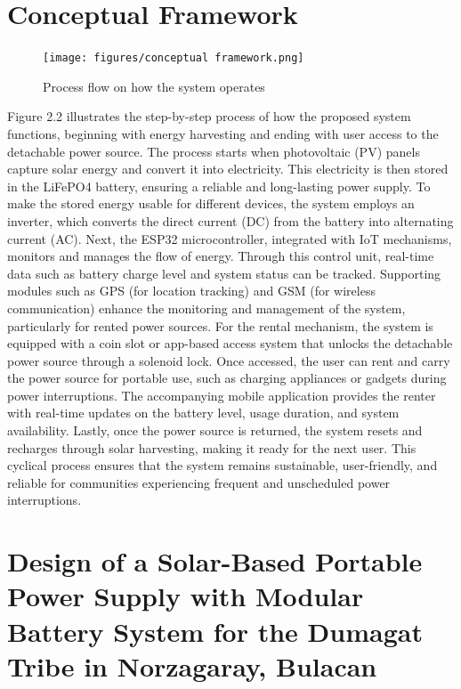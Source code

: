 {\section{Conceptual Framework}

\begin{figure}[H]
	\centering
	\caption{Process flow on how the system operates}
	\label{fig:conceptualfra}
	\texttt{[image: figures/conceptual framework.png]}
\end{figure}


Figure 2.2 illustrates the step-by-step process of how the proposed system functions, beginning with energy harvesting and ending with user access to the detachable power source. The process starts when photovoltaic (PV) panels capture solar energy and convert it into electricity. This electricity is then stored in the LiFePO4 battery, ensuring a reliable and long-lasting power supply. To make the stored energy usable for different devices, the system employs an inverter, which converts the direct current (DC) from the battery into alternating current (AC). Next, the ESP32 microcontroller, integrated with IoT mechanisms, monitors and manages the flow of energy. Through this control unit, real-time data such as battery charge level and system status can be tracked. Supporting modules such as GPS (for location tracking) and GSM (for wireless communication) enhance the monitoring and management of the system, particularly for rented power sources. For the rental mechanism, the system is equipped with a coin slot or app-based access system that unlocks the detachable power source through a solenoid lock. Once accessed, the user can rent and carry the power source for portable use, such as charging appliances or gadgets during power interruptions. The accompanying mobile application provides the renter with real-time updates on the battery level, usage duration, and system availability. Lastly, once the power source is returned, the system resets and recharges through solar harvesting, making it ready for the next user. This cyclical process ensures that the system remains sustainable, user-friendly, and reliable for communities experiencing frequent and unscheduled power interruptions.


\section{ Design of a Solar-Based Portable Power Supply with Modular Battery System for the Dumagat Tribe in Norzagaray, Bulacan}

}

